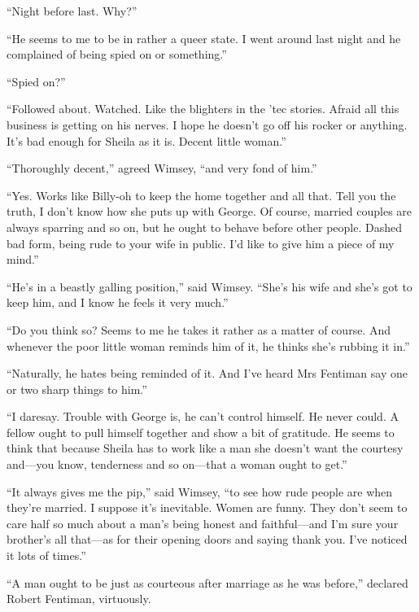 \enquote{Night before last. Why?}

\enquote{He seems to me to be in rather a queer state. I went around last night and he complained of being spied on or something.}

\enquote{Spied on?}

\enquote{Followed about. Watched. Like the blighters in the 'tec stories. Afraid all this business is getting on his nerves. I hope he doesn't go off his rocker or anything. It's bad enough for Sheila as it is. Decent little woman.}

\enquote{Thoroughly decent,} agreed Wimsey, \enquote{and very fond of him.}

\enquote{Yes. Works like Billy-oh to keep the home together and all that. Tell you the truth, I don't know how she puts up with George. Of course, married couples are always sparring and so on, but he ought to behave before other people. Dashed bad form, being rude to your wife in public. I'd like to give him a piece of my mind.}

\enquote{He's in a beastly galling position,} said Wimsey. \enquote{She's his wife and she's got to keep him, and I know he feels it very much.}

\enquote{Do you think so? Seems to me he takes it rather as a matter of course. And whenever the poor little woman reminds him of it, he thinks she's rubbing it in.}

\enquote{Naturally, he hates being reminded of it. And I've heard Mrs Fentiman say one or two sharp things to him.}

\enquote{I daresay. Trouble with George is, he can't control himself. He never could. A fellow ought to pull himself together and show a bit of gratitude. He seems to think that because Sheila has to work like a man she doesn't want the courtesy and\allowbreak---\allowbreak you know, tenderness and so on\allowbreak---\allowbreak that a woman ought to get.}

\enquote{It always gives me the pip,} said Wimsey, \enquote{to see how rude people are when they're married. I suppose it's inevitable. Women are funny. They don't seem to care half so much about a man's being honest and faithful\allowbreak---\allowbreak and I'm sure your brother's all that\allowbreak---\allowbreak as for their opening doors and saying thank you. I've noticed it lots of times.}

\enquote{A man ought to be just as courteous after marriage as he was before,} declared Robert Fentiman, virtuously.

